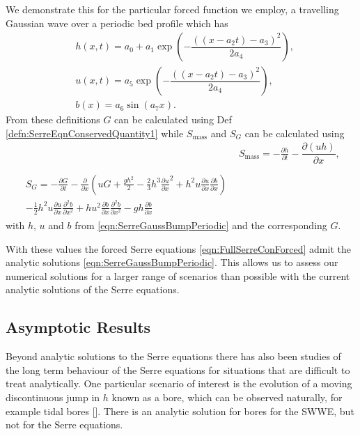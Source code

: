 We demonstrate this for the particular forced function we employ, a travelling Gaussian wave over a periodic bed profile which has
\begin{subequations}
	\begin{align}
	&h(x,t) = a_0 + a_1\exp\left(-\dfrac{ \left(\left(x - a_2t\right) - a_3 \right)^2}{2a_4}\right), \\
	&u(x,t) = a_5\exp\left(-\dfrac{ \left(\left(x - a_2t\right) - a_3 \right)^2}{2a_4}\right), \\
	&b(x) = a_6\sin\left(a_7 x\right).
	\end{align}
	\label{eqn:SerreGaussBumpPeriodic}
\end{subequations}
From these definitions $G$ can be calculated using Def \ref{defn:SerreEqnConservedQuantity1} while $S_{\text{mass}}$ and $S_{G}$ can be calculated using 
\begin{align*}
&  S_{\text{mass}} = -\frac{\partial h}{\partial t} - \dfrac{\partial (uh)}{\partial x} ,  \\ \nonumber \\
\begin{split}
S_{G} = -\frac{\partial G}{\partial t}  - \frac{\partial}{\partial x} \left( {u} G + \frac{gh^2}{2} - \frac{2}{3}h^3 \frac{\partial {u}}{\partial x}^2 + h^2 {u}\frac{\partial {u}}{\partial x}\frac{\partial b}{\partial x} \right) \\ - \frac{1}{2}h^2 {u} \frac{\partial {u}}{\partial x} \frac{\partial^2 b}{\partial x^2}  + h {u}^2\frac{\partial b}{\partial x}\frac{\partial^2 b}{\partial x^2} - gh\frac{\partial b}{\partial x}
\end{split}
\end{align*}
with $h$, $u$ and $b$ from \eqref{eqn:SerreGaussBumpPeriodic} and the corresponding $G$.

With these values the forced Serre equations \eqref{eqn:FullSerreConForced} admit the analytic solutions \eqref{eqn:SerreGaussBumpPeriodic}. This allows us to assess our numerical solutions for a larger range of scenarios than possible with the current analytic solutions of the Serre equations.


\subsection{Asymptotic Results}
Beyond analytic solutions to the Serre equations there has also been studies of the long term behaviour of the Serre equations for situations that are difficult to treat analytically. One particular scenario of interest is the evolution of a moving discontinuous jump in $h$ known as a bore, which can be observed naturally, for example tidal bores []. There is an analytic solution for bores for the SWWE, but not for the Serre equations.


